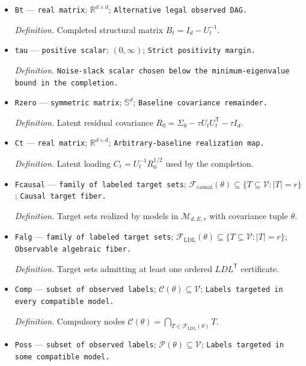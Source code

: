 \documentclass{article}
\begin{document}
\begin{itemize}
  \item \texttt{Bt} --- \texttt{real matrix}; \(\mathbb R^{d\times d}\); \texttt{Alternative legal observed DAG.}
  \par\smallskip\noindent\emph{Definition.} Completed structural matrix \(B_t=I_d-U_t^{-1}\).
  \item \texttt{tau} --- \texttt{positive scalar}; \((0,\infty)\); \texttt{Strict positivity margin.}
  \par\smallskip\noindent\emph{Definition.} \texttt{Noise-\allowbreak{}slack scalar chosen below the minimum-\allowbreak{}eigenvalue bound in the completion.}
  \item \texttt{Rzero} --- \texttt{symmetric matrix}; \(\mathbb S^d\); \texttt{Baseline covariance remainder.}
  \par\smallskip\noindent\emph{Definition.} Latent residual covariance \(R_0=\Sigma_0-\tau U_tU_t^{\mathsf T}-\tau I_d\).
  \item \texttt{Ct} --- \texttt{real matrix}; \(\mathbb R^{d\times d}\); \texttt{Arbitrary-\allowbreak{}baseline realization map.}
  \par\smallskip\noindent\emph{Definition.} Latent loading \(C_t=U_t^{-1}R_0^{1/2}\) used by the completion.
  \item \texttt{Fcausal} --- \texttt{family of labeled target sets}; \(\mathcal F_{\mathrm{causal}}(\theta)\subseteq\{T\subseteq\mathcal V:\lvert T\rvert=r\}\); \texttt{Causal target fiber.}
  \par\smallskip\noindent\emph{Definition.} Target sets realized by models in \(\mathcal M_{d,E,r}\) with covariance tuple \(\theta\).
  \item \texttt{Falg} --- \texttt{family of labeled target sets}; \(\mathcal F_{\mathrm{LDL}}(\theta)\subseteq\{T\subseteq\mathcal V:\lvert T\rvert=r\}\); \texttt{Observable algebraic fiber.}
  \par\smallskip\noindent\emph{Definition.} Target sets admitting at least one ordered \(LDL^{\mathsf T}\) certificate.
  \item \texttt{Comp} --- \texttt{subset of observed labels}; \(\mathcal C(\theta)\subseteq\mathcal V\); \texttt{Labels targeted in every compatible model.}
  \par\smallskip\noindent\emph{Definition.} Compulsory nodes \(\mathcal C(\theta)=\bigcap_{T\in\mathcal F_{\mathrm{LDL}}(\theta)}T\).
  \item \texttt{Poss} --- \texttt{subset of observed labels}; \(\mathcal P(\theta)\subseteq\mathcal V\); \texttt{Labels targeted in some compatible model.}

\end{itemize}
\end{document}
